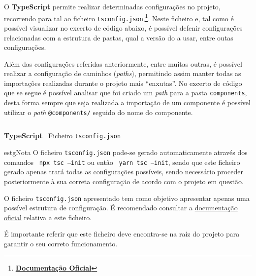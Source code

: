
O \textbf{TypeScript} permite realizar determinadas configurações no projeto, recorrendo para tal ao ficheiro \texttt{tsconfig.json},\footnote{\textbf{\href{https://www.typescriptlang.org/tsconfig}{Documentação Oficial}}}. Neste ficheiro e, tal como é possível visualizar no excerto de código abaixo, é possível defenir configurações relacionadas com a estrutura de pastas, qual a versão do  a usar, entre outas configurações.

Além das configurações referidas anteriormente, entre muitas outras, é possível realizar a configuração de caminhos (\textit{paths}), permitindo assim manter todas as importações realizadas durante o projeto mais ``enxutas''. No excerto de código que se segue é possível analisar que foi criado um \textit{path} para a pasta \texttt{components}, desta forma sempre que seja realizada a importação de um componente é possível utilizar o \textit{path} \texttt{@components/} seguido do nome do componente.

\begin{longlisting}
	\inputminted{json}{code/typescript/tsconfig.json}
	\caption{\textbf{TypeScript} \textemdash~Ficheiro \texttt{tsconfig.json}}
\end{longlisting}

\begin{mybox}{estg}{Nota}
	O ficheiro \texttt{tsconfig.json} pode-se gerado automaticamente através dos comandos ~\texttt{npx tsc --init} ou então ~\texttt{yarn tsc --init}, sendo que este ficheiro gerado apenas trará todas as configurações possíveis, sendo necessário proceder posteriormente à sua correta configuração de acordo com o projeto em questão.

	\vspace{0.35cm}

	O ficheiro \texttt{tsconfig.json} apresentado tem como objetivo apresentar apenas uma possível estrutura de configuração. É recomendado consultar a \href{https://www.typescriptlang.org/tsconfig}{documentação oficial} relativa a este ficheiro.

	\vspace{0.15cm}

	É importante referir que este ficheiro deve encontra-se na raíz do projeto para garantir o seu correto funcionamento.
\end{mybox}
